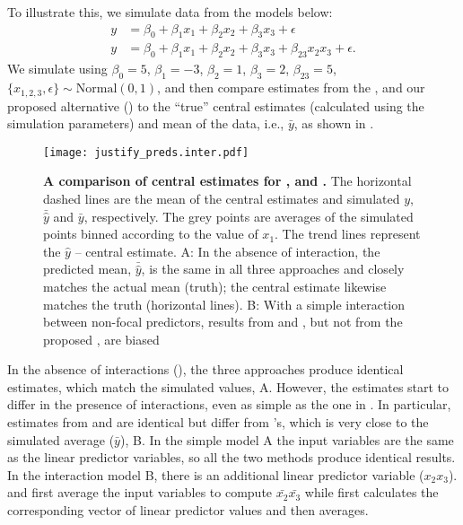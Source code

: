 To illustrate this, we simulate data from the models below:
%
\begin{align}
y &= \beta_0 + \beta_1x_1 + \beta_2x_2 + \beta_3x_3 + \epsilon \label{eq:simple_inter_higher_no_interaction}\\
y &= \beta_0 + \beta_1x_1 + \beta_2x_2 + \beta_3x_3 + \beta_{23}x_2x_3 + \epsilon \label{eq:simple_inter_higher}.
\end{align}
%
We simulate using $\beta_0 = 5$, $\beta_1 = -3$, $\beta_2 = 1$, $\beta_3 = 2$, $\beta_{23} = 5$, $\{x_{1,2,3}, \epsilon\} \sim \mathrm{Normal}(0, 1)$, and then compare estimates from the ,  and our proposed alternative () to the ``true'' central estimates (calculated using the simulation parameters) and mean of the data, i.e., $\bar{y}$, as shown in .
%
\begin{figure}
\begin{center}
\texttt{[image: justify\_preds.inter.pdf]}
\end{center}
\caption{{\bf A comparison of central estimates for ,  and .} The horizontal dashed lines are the mean of the central estimates and simulated $y$, $\bar{\hat{y}}$ and $\bar{y}$, respectively. The grey points are averages of the simulated points binned according to the value of $x_1$. The trend lines represent the $\hat{y}$ -- central estimate. A: In the absence of interaction, the predicted mean, $\bar{\hat{y}}$, is the same in all three approaches and closely matches the actual mean (truth); the central estimate likewise matches the truth (horizontal lines). B: With a simple interaction between non-focal predictors, results from  and , but not from the proposed , are biased}
\label{fig:justify_plots}
\end{figure}
%
In the absence of interactions (), the three approaches produce identical estimates, which match the simulated values, A. However, the estimates start to differ in the presence of interactions, even as simple as the one in . In particular, estimates from  and  are identical but differ from 's, which is very close to the simulated average ($\bar{y}$), B.
In the simple model A the input variables are the same as the linear predictor variables, so all the two methods produce identical results.
In the interaction model B, there is an additional linear predictor variable ($x_2x_3$).  and  first average the input variables to compute $\bar{x_2}\bar{x_3}$ while  first calculates the corresponding vector of linear predictor values and then averages.

